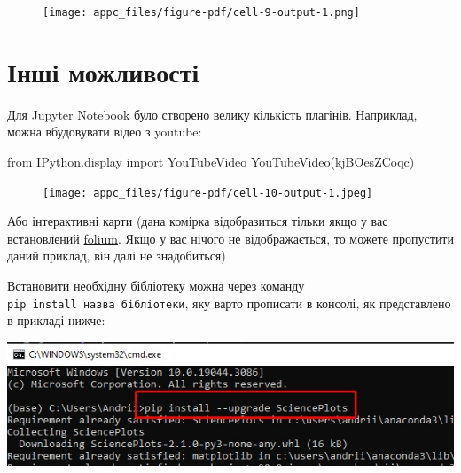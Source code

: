 \documentclass[
  letterpaper,
]{report}
\newenvironment{Shaded}{\begin{snugshade}}{\end{snugshade}}
\newcommand{\ImportTok}[1]{\textcolor[rgb]{0.00,0.46,0.62}{#1}}
\newcommand{\NormalTok}[1]{\textcolor[rgb]{0.00,0.23,0.31}{#1}}
\newcommand{\StringTok}[1]{\textcolor[rgb]{0.13,0.47,0.30}{#1}}
\begin{document}
\begin{figure}[H]

{\centering \texttt{[image: appc\_files/figure-pdf/cell-9-output-1.png]}

}

\end{figure}

\hypertarget{ux456ux43dux448ux456-ux43cux43eux436ux43bux438ux432ux43eux441ux442ux456}{%
\section{Інші
можливості}\label{ux456ux43dux448ux456-ux43cux43eux436ux43bux438ux432ux43eux441ux442ux456}}

Для Jupyter Notebook було створено велику кількість плагінів. Наприклад,
можна вбудовувати відео з youtube:

\begin{Shaded}
\begin{Highlighting}[]
\ImportTok{from}\NormalTok{ IPython.display }\ImportTok{import}\NormalTok{ YouTubeVideo}
\NormalTok{YouTubeVideo(}\StringTok{\textquotesingle{}kjBOesZCoqc\textquotesingle{}}\NormalTok{)}
\end{Highlighting}
\end{Shaded}

\begin{figure}[H]

{\centering \texttt{[image: appc\_files/figure-pdf/cell-10-output-1.jpeg]}

}

\end{figure}

Або інтерактивні карти (дана комірка відобразиться тільки якщо у вас
встановлений
\href{https://github.com/python-visualization/folium}{folium}. Якщо у
вас нічого не відображається, то можете пропустити даний приклад, він
далі не знадобиться)

Встановити необхідну бібліотеку можна через команду
\texttt{pip\ install\ назва\ бібліотеки}, яку варто прописати в консолі,
як представлено в прикладі нижче:

\includegraphics{Images/ap3/Screenshot_1.jpg}
\end{document}
